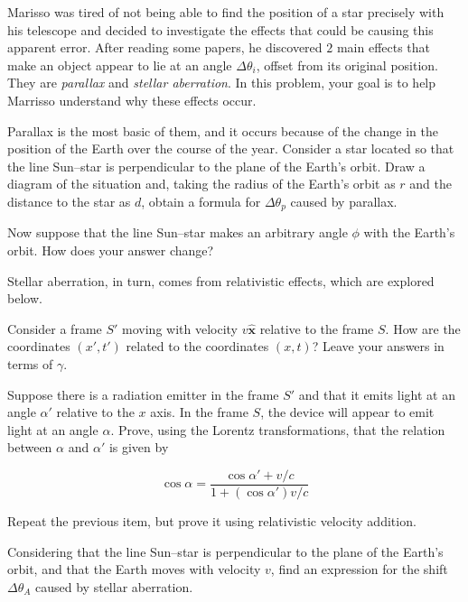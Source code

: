 \documentclass[11pt]{article}
\begin{document}
\begin{pproblem} Marisso was tired of not being able to find the position of a star precisely with his telescope and decided to investigate the effects that could be causing this apparent error. After reading some papers, he discovered \(2\) main effects that make an object appear to lie at an angle \(\Delta \theta_i\), offset from its original position. They are \textit{parallax} and \textit{stellar aberration}. In this problem, your goal is to help Marrisso understand why these effects occur.
    \begin{alternativas}
        \item Parallax is the most basic of them, and it occurs because of the change in the position of the Earth over the course of the year. Consider a star located so that the line Sun--star is perpendicular to the plane of the Earth's orbit. Draw a diagram of the situation and, taking the radius of the Earth's orbit as \(r\) and the distance to the star as \(d\), obtain a formula for \(\Delta \theta_p\) caused by parallax.
        
        \item Now suppose that the line Sun--star makes an arbitrary angle \(\phi\) with the Earth's orbit. How does your answer change?
        
        Stellar aberration, in turn, comes from relativistic effects, which are explored below.

        \item Consider a frame \(S'\) moving with velocity \(v\hat{\mathbf{x}}\) relative to the frame \(S\). How are the coordinates \((x', t')\) related to the coordinates \((x,t)\)? Leave your answers in terms of \(\gamma\).
        
        \item Suppose there is a radiation emitter in the frame \(S'\) and that it emits light at an angle \(\alpha'\) relative to the \(x\) axis. In the frame \(S\), the device will appear to emit light at an angle \(\alpha\). Prove, using the Lorentz transformations, that the relation between \(\alpha\) and \(\alpha'\) is given by
        
        \[\cos\alpha = \frac{\cos\alpha' + v/c}{1+(\cos\alpha') v/c}\]

        \item Repeat the previous item, but prove it using relativistic velocity addition.

        \item Considering that the line Sun--star is perpendicular to the plane of the Earth's orbit, and that the Earth moves with velocity \(v\), find an expression for the shift \(\Delta\theta_A\) caused by stellar aberration.
    

\end{alternativas}
\end{pproblem}
\end{document}
